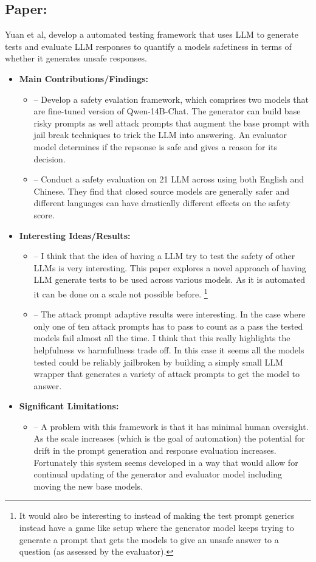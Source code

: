 \documentclass{article}[11pt]
\newcommand{\paperdetails}[5]{
\subsection*{Paper: \fullcite{#1}}
#2
\begin{itemize}
    \item \textbf{Main Contributions/Findings:}
    \begin{itemize}
        #3
    \end{itemize}
    \item \textbf{Interesting Ideas/Results:}
    \begin{itemize}
        #4
    \end{itemize}
    \item \textbf{Significant Limitations:}
    \begin{itemize}
        #5
    \end{itemize}
\end{itemize}
}
\begin{document}
\begin{mdframed}[]
\paperdetails{yuanSEvalAutomatedComprehensive2025}{
    Yuan et al, develop a automated testing framework that uses LLM to generate tests and evaluate LLM responses to quantify a models safetiness in terms of whether it generates unsafe responses.
}{
    \item [--] Develop a safety evalation framework, which comprises two models that are fine-tuned version of Qwen-14B-Chat. The generator can build base risky prompts as well attack prompts that augment the base prompt with jail break techniques to trick the LLM into answering. An evaluator model determines if the repsonse is safe and gives a reason for its decision.
    \item [--] Conduct a safety evaluation on 21 LLM across using both English and Chinese. They find that closed source models are generally safer and different languages can have drastically different effects on the safety score.
}{
    \item [--] I think that the idea of having a LLM try to test the safety of other LLMs is very interesting. This paper explores a novel approach of having LLM generate tests to be used across various models. As it is automated it can be done on a scale not possible before. \footnote{It would also be interesting to instead of making the test prompt generics instead have a game like setup where the generator model keeps trying to generate a prompt that gets the models to give an unsafe answer to a question (as assessed by the evaluator).}
    \item [--] The attack prompt adaptive results were interesting. In the case where only one of ten attack prompts has to pass to count as a pass the tested models fail almost all the time. I think that this really highlights the helpfulness vs harmfullness trade off. In this case it seems all the models tested could be reliably jailbroken by building a simply small LLM wrapper that generates a variety of attack prompts to get the model to answer.
}{
    \item [--] A problem with this framework is that it has minimal human oversight. As the scale increases (which is the goal of automation) the potential for drift in the prompt generation and response evaluation increases. Fortunately this system seems developed in a way that would allow for continual updating of the generator and evaluator model including moving the new base models.
}

\end{mdframed}
\end{document}
